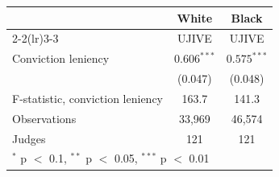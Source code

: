 \begin{tabular}{lcc}
\toprule
 & \multicolumn{1}{c}{White} & \multicolumn{1}{c}{Black} \\
\cmidrule(lr){2-2}\cmidrule(lr){3-3}
 & UJIVE & UJIVE \\
\midrule
Conviction leniency & $0.606^{***}$ & $0.575^{***}$ \\
 & (0.047) & (0.048) \\
\midrule
F-statistic, conviction leniency & 163.7 & 141.3 \\
Observations & 33,969 & 46,574 \\
Judges & 121 & 121 \\
\bottomrule
\multicolumn{3}{l}{\footnotesize $^{*}$ p $<$ 0.1, $^{**}$ p $<$ 0.05, $^{***}$ p $<$ 0.01} \\
\end{tabular}
